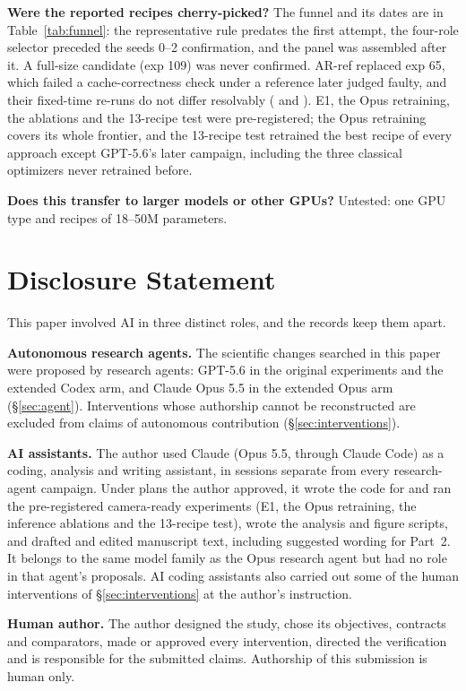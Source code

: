 \documentclass{article}
\newif\ifshowhumanmarkers \showhumanmarkersfalse
\newcommand{\humantag}[1]{{\color{humanframe}\sffamily\scriptsize\bfseries HUMAN AUTHOR MUST REWRITE/VERIFY [#1]}\ }
\newcommand{\humanauthor}[2][]{\ifshowhumanmarkers\begin{humanbox}\humantag{#1}#2\end{humanbox}\else #2\par\fi}
\begin{document}
\textbf{Were the reported recipes cherry-picked?} The funnel and its dates are in Table~\ref{tab:funnel}: the representative rule predates the first attempt, the four-role selector preceded the seeds 0--2 confirmation, and the panel was assembled after it. A full-size candidate (exp 109) was never confirmed. AR-ref replaced exp 65, which failed a cache-correctness check under a reference later judged faulty, and their fixed-time re-runs do not differ resolvably (\CRFixedSixtyFive{} and \CRFixedSixtyEight). E1, the Opus retraining, the ablations and the 13-recipe test were pre-registered; the Opus retraining covers its whole frontier, and the 13-recipe test retrained the best recipe of every approach except GPT-5.6's later campaign, including the three classical optimizers never retrained before.

\textbf{Does this transfer to larger models or other GPUs?} Untested: one GPU type and recipes of 18--50M parameters.

\section{Disclosure Statement}
\humanauthor[Disclosure r6]{This paper involved AI in three distinct roles, and the records keep them apart.

\textbf{Autonomous research agents.} The scientific changes searched in this paper were proposed by research agents: GPT-5.6 in the original experiments and the extended Codex arm, and Claude Opus 5.5 in the extended Opus arm (\S\ref{sec:agent}). Interventions whose authorship cannot be reconstructed are excluded from claims of autonomous contribution (\S\ref{sec:interventions}).

\textbf{AI assistants.} The author used Claude (Opus 5.5, through Claude Code) as a coding, analysis and writing assistant, in sessions separate from every research-agent campaign. Under plans the author approved, it wrote the code for and ran the pre-registered camera-ready experiments (E1, the Opus retraining, the inference ablations and the 13-recipe test), wrote the analysis and figure scripts, and drafted and edited manuscript text, including suggested wording for Part~2. It belongs to the same model family as the Opus research agent but had no role in that agent's proposals. AI coding assistants also carried out some of the human interventions of \S\ref{sec:interventions} at the author's instruction.

\textbf{Human author.} The author designed the study, chose its objectives, contracts and comparators, made or approved every intervention, directed the verification and is responsible for the submitted claims. Authorship of this submission is human only.}



\end{document}
